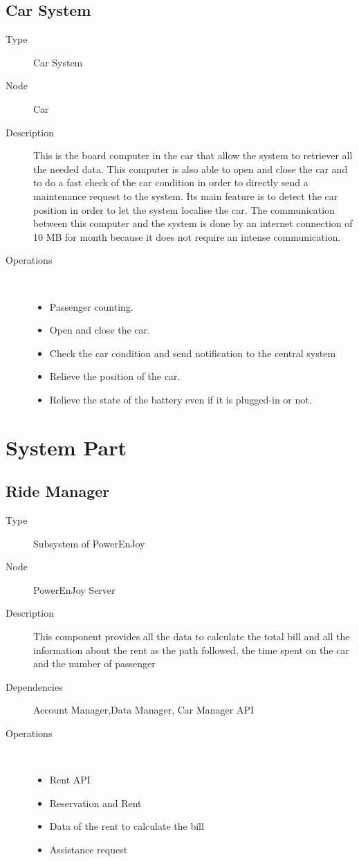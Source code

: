 \subsection{Car System}
\begin{description}
	\item[Type] Car System
	\item[Node] Car
	\item[Description] This is the board computer in the car that allow the system to retriever all the needed data. This computer is also able to open and close the car and to do a fast check of the car condition in order to directly send a maintenance request to the system. Its main feature is to detect the car position in order to let the system localise the car. The communication between this computer and the system is done by an internet connection of 10 MB for month because it does not require an intense communication.
	\item[Operations] \ \\
		\begin{itemize}
			\item Passenger counting.
			\item Open and close the car.
			\item Check the car condition and send notification to the central system
			\item Relieve the position of the car.
			\item Relieve the state of the battery even if it is plugged-in or not. 
		\end{itemize}
\end{description}


\section{System Part}
\subsection{Ride Manager}
\begin{description}
	\item[Type] Subsystem of PowerEnJoy
	\item[Node] PowerEnJoy Server
	\item[Description] This component provides all the data to calculate the total bill and all the information about the rent as the path followed, the time spent on the car and the number of passenger
	\item[Dependencies] Account Manager,Data Manager, Car Manager API
	\item[Operations] \ \\
		\begin{itemize}
			\item Rent API
			\item Reservation and Rent 
			\item Data of the rent to calculate the bill
			\item Assistance request
	\end{itemize}
\end{description}


